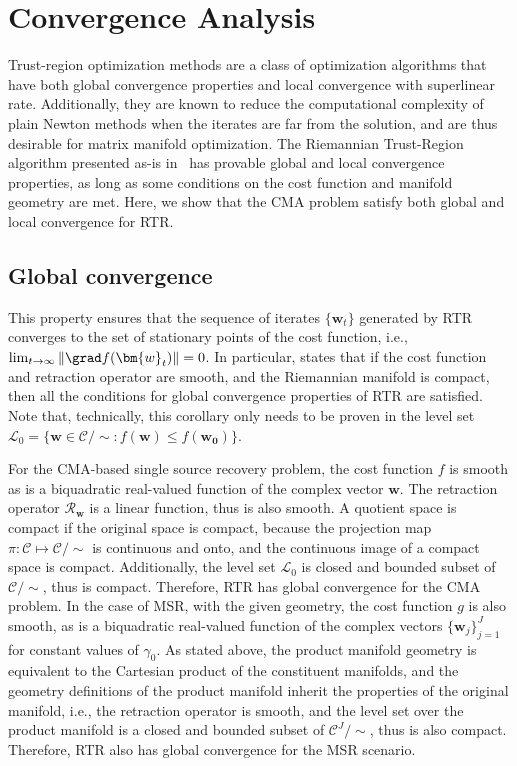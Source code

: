\section{Convergence Analysis} \label{convergence_rtr}
Trust-region optimization methods are a class of optimization algorithms that have both global convergence properties and local convergence with superlinear rate. Additionally, they are known to reduce the computational complexity of plain Newton methods when the iterates are far from the solution, and are thus desirable for matrix manifold optimization. %
The Riemannian Trust-Region algorithm presented as-is in~\cite{Absil2007trustregions} has provable global and local convergence properties, as long as some conditions on the cost function and manifold geometry are met. Here, we show that the CMA problem satisfy both global and local convergence for RTR.

\subsection{Global convergence}
This property ensures that the sequence of iterates $\{\bm{w}_t\}$ generated by RTR converges to the set of stationary points of the cost function, i.e., $
\lim_{t\rightarrow\infty}\|\grad f(\bm{w}_t)\|=0$.
In particular, \cite[Corollary 4.6]{Absil2007trustregions} states that if the cost function and retraction operator are smooth, and the Riemannian manifold is compact, then all the conditions for global convergence properties of RTR are satisfied. Note that, technically, this corollary only needs to be proven in the level set $\mathcal{L}_0=\{\bm{w}\in\mathcal{C}/{\sim}:f(\bm{w})\leq f(\bm{\bm{w}_0})\}$.

For the CMA-based single source recovery problem, the cost function $f$ is smooth as is a biquadratic real-valued function of the complex vector $\bm{w}$. The retraction operator $\mathcal{R}_{\bm{w}}$ is a linear function, thus is also smooth. A quotient space is compact if the original space is compact, because the projection map $\pi:\mathcal{C}\mapsto\mathcal{C}/{\sim}$ is continuous and onto, and the continuous image of a compact space is compact. Additionally, the level set $\mathcal{L}_0$ is closed and bounded subset of $\mathcal{C}/{\sim}$, thus is compact. Therefore, RTR has global convergence for the CMA problem.
In the case of MSR, with the given geometry, the cost function $g$ is also smooth, as is a biquadratic real-valued function of the complex vectors $\{\bm{w}_j\}_{j=1}^J$ for constant values of $\gamma_0$. As stated above, the product manifold geometry is equivalent to the Cartesian product of the constituent manifolds, and the geometry definitions of the product manifold inherit the properties of the original manifold, i.e., the retraction operator is smooth, and the level set over the product manifold is a closed and bounded subset of $\mathcal{C}^J/{\sim}$, thus is also compact. Therefore, RTR also has global convergence for the MSR scenario.


